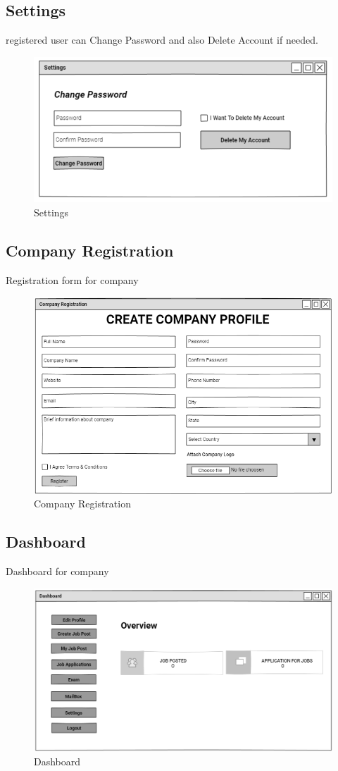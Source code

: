 \documentclass[a4paper,12pt]{report}
\begin{document}
\pagebreak
\subsection {Settings}
registered user can Change  Password   and also Delete Account if needed.
\begin{figure}[bph]
	\centering
	\includegraphics[width=.6\linewidth ]{img/user/changeuserpassword}
	\caption{Settings}
\end{figure}

\subsection {Company Registration}
Registration form for company
\begin{figure}[bph]
	\centering
	\includegraphics[width=.8\linewidth ]{img/company/company_registration}
	\caption{Company Registration}
\end{figure}
\pagebreak
\subsection {Dashboard}
Dashboard for company
\begin{figure}[bph]
	\centering
	\includegraphics[width=1\linewidth]{img/company/untitled_page}
	\caption{Dashboard}
\end{figure}
\end{document}
